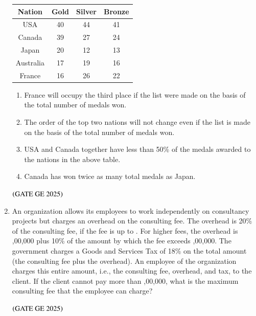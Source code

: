 \documentclass[journal,12pt,onecolumn]{IEEEtran}
\theoremstyle{remark}
\begin{document}
\begin{enumerate}
\begin{table}[h]
\centering
\begin{tabular}{|c|c|c|c|}
\hline
Nation & Gold & Silver & Bronze \\
\hline
USA & 40 & 44 & 41 \\
Canada & 39 & 27 & 24 \\
Japan & 20 & 12 & 13 \\
Australia & 17 & 19 & 16 \\
France & 16 & 26 & 22 \\
\hline
\end{tabular}
\end{table}
\begin{enumerate}
\item France will occupy the third place if the list were made on the basis of the total number of medals won.
\item The order of the top two nations will not change even if the list is made on the basis of the total number of medals won.
\item USA and Canada together have less than 50\% of the medals awarded to the nations in the above table.
\item Canada has won twice as many total medals as Japan.
\end{enumerate}
\hfill $\left(\text{GATE GE 2025}\right)$
\bigskip
\item An organization allows its employees to work independently on consultancy projects but charges an overhead on the consulting fee. The overhead is 20\% of the consulting fee, if the fee is up to 
. For higher fees, the overhead is ,00,000 plus 10\% of the amount by which the fee exceeds ,00,000. The government charges a Goods and Services Tax of 18\% on the total amount (the consulting fee plus the overhead). An employee of the organization charges this entire amount, i.e., the consulting fee, overhead, and tax, to the client. If the client cannot pay more than ,00,000, what is the maximum consulting fee that the employee can charge?
\begin{enumerate}
\end{enumerate}
\hfill $\left(\text{GATE GE 2025}\right)$
\bigskip
\end{enumerate}
\end{document}
